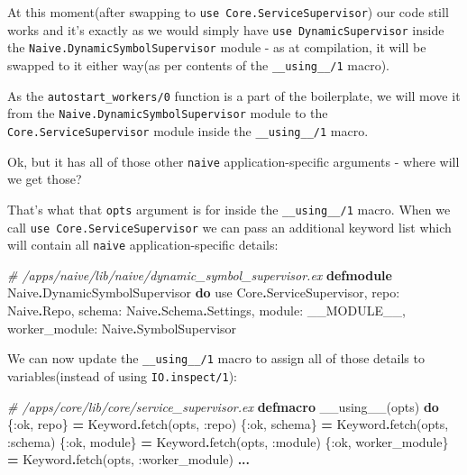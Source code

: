 \documentclass[
]{book}
\newenvironment{Shaded}{\begin{snugshade}}{\end{snugshade}}
\newcommand{\CommentTok}[1]{\textcolor[rgb]{0.56,0.35,0.01}{\textit{#1}}}
\newcommand{\ConstantTok}[1]{\textcolor[rgb]{0.00,0.00,0.00}{#1}}
\newcommand{\ImportTok}[1]{#1}
\newcommand{\KeywordTok}[1]{\textcolor[rgb]{0.13,0.29,0.53}{\textbf{#1}}}
\newcommand{\NormalTok}[1]{#1}
\newcommand{\OperatorTok}[1]{\textcolor[rgb]{0.81,0.36,0.00}{\textbf{#1}}}
\newcommand{\VariableTok}[1]{\textcolor[rgb]{0.00,0.00,0.00}{#1}}
\begin{document}
At this moment(after swapping to \texttt{use\ Core.ServiceSupervisor}) our code still works and it's exactly as we would simply have \texttt{use\ DynamicSupervisor} inside the \texttt{Naive.DynamicSymbolSupervisor} module - as at compilation, it will be swapped to it either way(as per contents of the \texttt{\_\_using\_\_/1} macro).

As the \texttt{autostart\_workers/0} function is a part of the boilerplate, we will move it from the \texttt{Naive.DynamicSymbolSupervisor} module to the \texttt{Core.ServiceSupervisor} module inside the \texttt{\_\_using\_\_/1} macro.

Ok, but it has all of those other \texttt{naive} application-specific arguments - where will we get those?

That's what that \texttt{opts} argument is for inside the \texttt{\_\_using\_\_/1} macro. When we call \texttt{use\ Core.ServiceSupervisor} we can pass an additional keyword list which will contain all \texttt{naive} application-specific details:

\begin{Shaded}
\begin{Highlighting}[]
\CommentTok{\# /apps/naive/lib/naive/dynamic\_symbol\_supervisor.ex}
\KeywordTok{defmodule} \ConstantTok{Naive}\OperatorTok{.}\ConstantTok{DynamicSymbolSupervisor} \KeywordTok{do}
  \ImportTok{use} \ConstantTok{Core}\OperatorTok{.}\ConstantTok{ServiceSupervisor}\NormalTok{,}
    \VariableTok{repo:} \ConstantTok{Naive}\OperatorTok{.}\ConstantTok{Repo}\NormalTok{,}
    \VariableTok{schema:} \ConstantTok{Naive}\OperatorTok{.}\ConstantTok{Schema}\OperatorTok{.}\ConstantTok{Settings}\NormalTok{,}
    \VariableTok{module:} \ConstantTok{\_\_MODULE\_\_}\NormalTok{,}
    \VariableTok{worker\_module:} \ConstantTok{Naive}\OperatorTok{.}\ConstantTok{SymbolSupervisor}
\end{Highlighting}
\end{Shaded}

We can now update the \texttt{\_\_using\_\_/1} macro to assign all of those details to variables(instead of using \texttt{IO.inspect/1}):

\begin{Shaded}
\begin{Highlighting}[]
  \CommentTok{\# /apps/core/lib/core/service\_supervisor.ex}
  \KeywordTok{defmacro}\NormalTok{ \_\_using\_\_(opts) }\KeywordTok{do}
\NormalTok{    \{}\VariableTok{:ok}\NormalTok{, repo\} }\OperatorTok{=} \ConstantTok{Keyword}\OperatorTok{.}\NormalTok{fetch(opts, }\VariableTok{:repo}\NormalTok{)}
\NormalTok{    \{}\VariableTok{:ok}\NormalTok{, schema\} }\OperatorTok{=} \ConstantTok{Keyword}\OperatorTok{.}\NormalTok{fetch(opts, }\VariableTok{:schema}\NormalTok{)}
\NormalTok{    \{}\VariableTok{:ok}\NormalTok{, module\} }\OperatorTok{=} \ConstantTok{Keyword}\OperatorTok{.}\NormalTok{fetch(opts, }\VariableTok{:module}\NormalTok{)}
\NormalTok{    \{}\VariableTok{:ok}\NormalTok{, worker\_module\} }\OperatorTok{=} \ConstantTok{Keyword}\OperatorTok{.}\NormalTok{fetch(opts, }\VariableTok{:worker\_module}\NormalTok{)}
    \OperatorTok{...}
\end{Highlighting}
\end{Shaded}
\end{document}

